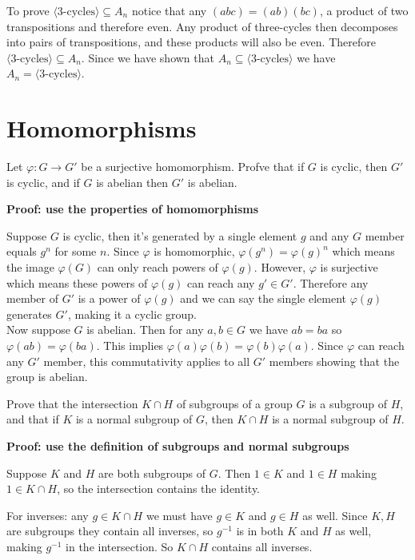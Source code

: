 \documentclass{article}
\begin{document}
To prove $\langle \text{3-cycles} \rangle \subseteq A_n$ notice that any $(abc) = (ab)(bc)$, a product of two transpositions and therefore even. Any product of three-cycles then decomposes into pairs of transpositions, and these products will also be even. Therefore $\langle \text{3-cycles} \rangle \subseteq A_n$. Since we have shown that $A_n \subseteq \langle \text{3-cycles}\rangle$ we have $A_n = \langle \text{3-cycles} \rangle$.

\section{Homomorphisms}
\begin{problem}
Let $\varphi: G \to G'$ be a surjective homomorphism. Profve that if $G$ is cyclic, then $G'$ is cyclic, and if $G$ is abelian then $G'$ is abelian.
\end{problem}

\textbf{Proof: use the properties of homomorphisms}

Suppose $G$ is cyclic, then it's generated by a single element $g$ and any $G$ member equals $g^n$ for some $n$. Since $\varphi$ is homomorphic, $\varphi(g^n) = \varphi(g)^n$ which means the image $\varphi(G)$ can only reach powers of $\varphi(g)$. However, $\varphi$ is surjective which means these powers of $\varphi(g)$ can reach any $g' \in G'$. Therefore any member of $G'$ is a power of $\varphi(g)$ and we can say the single element $\varphi(g)$ generates $G'$, making it a cyclic group.
\\

Now suppose $G$ is abelian. Then for any $a, b \in G$ we have $ab = ba$ so $\varphi(ab) = \varphi(ba)$. This implies $\varphi(a)\varphi(b) = \varphi(b)\varphi(a)$. Since $\varphi$ can reach any $G'$ member, this commutativity applies to all $G'$ members showing that the group is abelian.

\begin{problem}
Prove that the intersection $K \cap H$ of subgroups of a group $G$ is a subgroup of $H$, and that if $K$ is a normal subgroup of $G$, then $K \cap H$ is a normal subgroup of $H$.
\end{problem}

\textbf{Proof: use the definition of subgroups and normal subgroups}

Suppose $K$ and $H$ are both subgroups of $G$. Then $1 \in K$ and $1 \in H$ making $1 \in K \cap H$, so the intersection contains the identity.

For inverses: any $g \in K \cap H$ we must have $g \in K$ and $g \in H$ as well. Since $K, H$ are subgroups they contain all inverses, so $g^{-1}$ is in both $K$ and $H$ as well, making $g^{-1}$ in the intersection. So $K \cap H$ contains all inverses.
\end{document}
